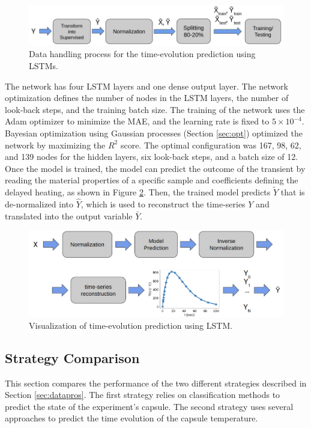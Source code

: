 \begin{figure}[htbp!] %
  \centering
  \includegraphics[width=0.7\linewidth]{figures/data-pross-lstm}
  \caption{Data handling process for the time-evolution prediction using LSTMs.}
  \label{fig:data-lstm}
\end{figure}

The network has four LSTM layers and one dense output layer.
The network optimization defines the number of nodes in the LSTM layers, the number of look-back steps, and the training batch size.
The training of the network uses the Adam optimizer to minimize the \gls*{MAE}, and the learning rate is fixed to $5 \times 10^{-4}$.
Bayesian optimization using Gaussian processes (Section \ref{sec:opt}) optimized the network by maximizing the $R^2$ score.
The optimal configuration was 167, 98, 62, and 139 nodes for the hidden layers, six look-back steps, and a batch size of 12.
Once the model is trained, the model can predict the outcome of the transient by reading the material properties of a specific sample and coefficients defining the delayed heating, as shown in Figure \ref{fig:data-reg3}.
Then, the trained model predicts $\tilde{Y}$ that is de-normalized into $\hat{Y}$, which is used to reconstruct the time-series $Y$ and translated into the output variable $\bar{Y}$.

\begin{figure}[htbp!] %
  \centering
  \includegraphics[width=0.7\linewidth]{figures/data-prediction-lstm}
  \caption{Visualization of time-evolution prediction using LSTM.}
  \label{fig:data-reg3}
\end{figure}


\subsection{Strategy Comparison}
\label{sec:comp}

This section compares the performance of the two different strategies described in Section \ref{sec:datapros}.
The first strategy relies on classification methods to predict the state of the experiment's capsule.
The second strategy uses several approaches to predict the time evolution of the capsule temperature.

